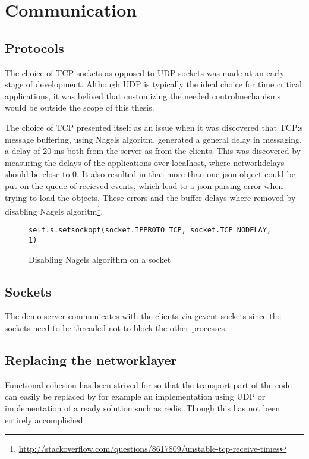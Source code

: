 \section{Communication}

\subsection{Protocols}
The choice of TCP-sockets as opposed to UDP-sockets was made at an early stage of development. Although UDP is typically the ideal choice for time critical applications, it was belived that customizing the needed controlmechanisms would be outside the scope of this thesis. 

The choice of TCP presented itself as an issue when it was discovered that TCP:s message buffering, using Nagels algoritm, generated a general delay in messaging, a delay of 20 ms both from the server as from the clients. This was discovered by measuring the delays of the applications over localhost, where networkdelays should be close to 0. It also resulted in that more than one json object could be put on the queue of recieved events, which lead to a json-parsing error when trying to load the objects. These errors and the buffer delays where removed by disabling Nagels algoritm\footnote{\url{http://stackoverflow.com/questions/8617809/unstable-tcp-receive-times}}.


\begin{figure}[h!]
\centering
\texttt{self.s.setsockopt(socket.IPPROTO\_TCP, socket.TCP\_NODELAY, 1)}
\caption{Disabling Nagels algorithm on a socket}
\end{figure}

\subsection{Sockets}
The demo server communicates with the clients via gevent sockets since the sockets need to be threaded not to block the other processes. 


\subsection{Replacing the networklayer}
Functional cohesion has been strived for so that the transport-part of the code can easily be replaced by for example an implementation using UDP or implementation of a ready solution such as redis. Though this has not been entirely accomplished %





